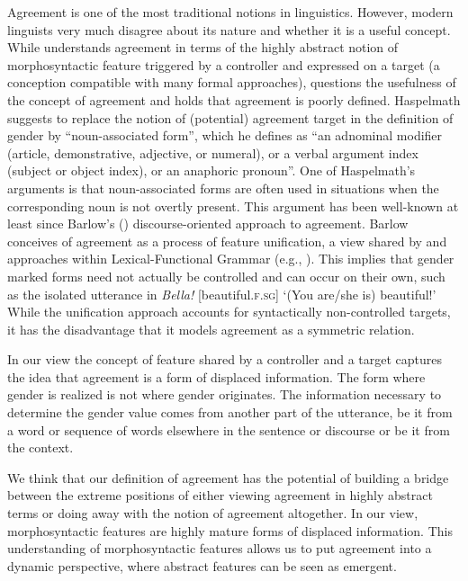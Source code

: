 \documentclass[output=collectionpaper]{langsci/langscibook}
\begin{document}
Agreement is one of the most traditional notions in linguistics. However, modern linguists very much disagree about its nature and whether it is a useful concept. While \cite{Corbett2006} understands agreement in terms of the highly abstract notion of morphosyntactic feature triggered by a controller and expressed on a target (a conception compatible with many formal approaches), \cite{Croft2013} questions the usefulness of the concept of agreement and \cite{Haspelmath2018} holds that agreement is poorly defined. Haspelmath suggests to replace the notion of (potential) agreement target in the definition of gender by ``noun-associated form'', which he defines as ``an adnominal modifier (article, demonstrative, adjective, or numeral), or a verbal argument index (subject or object index), or an anaphoric pronoun''. One of Haspelmath's arguments is that noun-associated forms are often used in situations when the corresponding noun is not overtly present. This argument has been well-known at least since Barlow's (\citealt*[190]{Barlow1999}) discourse-oriented approach to agreement. Barlow conceives of agreement as a process of feature unification, a view shared by \cite{Corbett2006} and approaches within Lexical-Functional Grammar (e.g., \citealt{Kuhn2007}). This implies that gender marked forms need not actually be controlled and can occur on their own, such as the isolated utterance in  \textit{Bella!} [beautiful.\textsc{f.sg}] `(You are/she is) beautiful!' While the unification approach accounts for syntactically non-controlled targets, it has the disadvantage that it models agreement as a symmetric relation.

In our view the concept of feature shared by a controller and a target captures the idea that agreement is a form of displaced information. The form where gender is realized is not where gender originates. The information necessary to determine the gender value comes from another part of the utterance, be it from a word or sequence of words elsewhere in the sentence or discourse or be it from the context.

We think that our definition of agreement has the potential of building a bridge between the extreme positions of either viewing agreement in highly abstract terms or doing away with the notion of agreement altogether. In our view, morphosyntactic features are highly mature forms of displaced information. This understanding of morphosyntactic features allows us to put agreement into a dynamic perspective, where abstract features can be seen as emergent.
\end{document}
